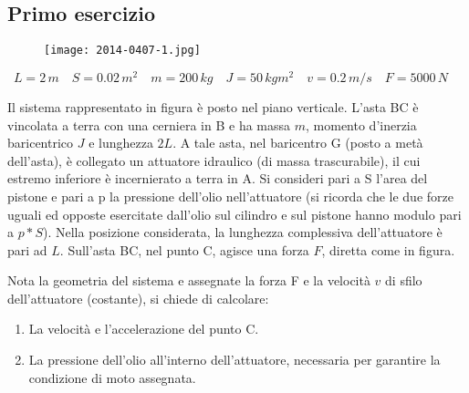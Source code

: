 \documentclass[main.tex]{subfiles}
\begin{document}
\subsection{Primo esercizio}

\begin{figure}[H]
\centering
\texttt{[image: 2014-0407-1.jpg]}
\end{figure}

\[
	L = 2\,m \quad
	S = 0.02\,m^2 \quad
	m = 200\,kg \quad
	J = 50\,kg m^2 \quad
	v = 0.2\,m/s \quad
	F = 5000\,N \quad
\]

Il sistema rappresentato in figura è posto nel piano verticale. L'asta BC è vincolata a terra con una cerniera in B e ha massa $m$, momento d'inerzia baricentrico $J$ e lunghezza $2L$. A tale asta, nel baricentro G (posto a metà dell'asta), è collegato un attuatore idraulico (di massa trascurabile), il cui estremo inferiore è incernierato a terra in A. Si consideri pari a S l'area del pistone e pari a p la pressione dell’olio nell'attuatore (si ricorda che le due forze uguali ed opposte esercitate dall’olio sul cilindro e sul pistone hanno modulo pari a $p*S$).
Nella posizione considerata, la lunghezza complessiva dell'attuatore è pari ad $L$. Sull'asta BC, nel punto C, agisce una forza $F$, diretta come in figura.

Nota la geometria del sistema e assegnate la forza F e la velocità $v$ di sfilo dell'attuatore (costante), si chiede di calcolare:
\begin{enumerate}
\item La velocità e l’accelerazione del punto C.
\item La pressione dell’olio all'interno dell'attuatore, necessaria per garantire la condizione di moto assegnata.
\end{enumerate}

\clearpage
\end{document}
